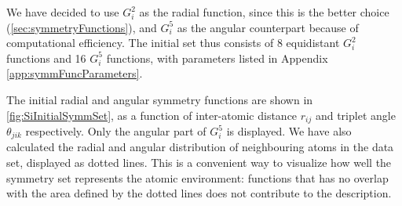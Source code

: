\documentclass[twoside,english]{uiofysmaster}
\begin{document}
We have decided to use $G_i^2$ as the radial function, 
since this is the better choice (\autoref{sec:symmetryFunctions}), and $G_i^5$ as the angular counterpart
because of computational efficiency. The initial set thus consists of 8 equidistant $G_i^2$ functions and 16 $G_i^5$ functions, 
with parameters listed in Appendix \autoref{app:symmFuncParameters}.

The initial radial and angular symmetry functions are shown in \autoref{fig:SiInitialSymmSet}, as a function 
of inter-atomic distance $r_{ij}$ and triplet angle $\theta_{jik}$ respectively. 
Only the angular part of $G_i^5$ is displayed. 
We have also calculated the radial and angular distribution of neighbouring atoms in the data set, displayed as dotted lines.
This is a convenient way to visualize how well the symmetry set represents the atomic environment:
functions that has no overlap with the area defined by the dotted lines does not contribute to the description. 
\end{document}
